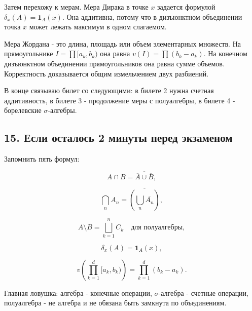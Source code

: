 \documentclass[
  11pt,
  a4paper,
]{article}
\begin{document}
Затем перехожу к мерам. Мера Дирака в точке \(x\) задается формулой
\(\delta_x(A)=\mathbf 1_A(x)\). Она аддитивна, потому что в дизъюнктном
объединении точка \(x\) может лежать максимум в одном слагаемом.

Мера Жордана - это длина, площадь или объем элементарных множеств. На
прямоугольнике \(I=\prod[a_k,b_k)\) она равна \(v(I)=\prod(b_k-a_k)\).
На конечном дизъюнктном объединении прямоугольников она равна сумме
объемов. Корректность доказывается общим измельчением двух разбиений.

В конце связываю билет со следующими: в билете 2 нужна счетная
аддитивность, в билете 3 - продолжение меры с полуалгебры, в билете 4 -
борелевские \(\sigma\)-алгебры.

\subsection{15. Если осталось 2 минуты перед
экзаменом}\label{ux435ux441ux43bux438-ux43eux441ux442ux430ux43bux43eux441ux44c-2-ux43cux438ux43dux443ux442ux44b-ux43fux435ux440ux435ux434-ux44dux43aux437ux430ux43cux435ux43dux43eux43c}

Запомнить пять формул:

\[
A\cap B=\overline{\overline{A}\cup \overline{B}},
\]

\[
\bigcap_n A_n=\overline{\left(\bigcup_n \overline{A_n}\right)},
\]

\[
A\setminus B=\bigsqcup_{k=1}^n C_k\quad\text{для полуалгебры},
\]

\[
\delta_x(A)=\mathbf 1_A(x),
\]

\[
v\left(\prod_{k=1}^d[a_k,b_k)\right)=\prod_{k=1}^d(b_k-a_k).
\]

Главная ловушка: алгебра - конечные операции, \(\sigma\)-алгебра -
счетные операции, полуалгебра - не алгебра и не обязана быть замкнута по
объединениям.

\newpage
\end{document}
